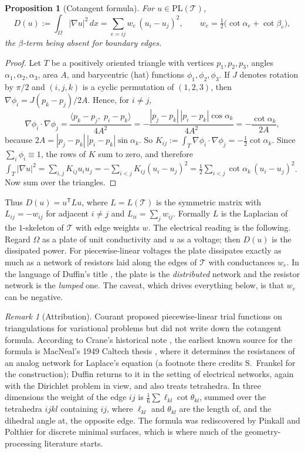 \documentclass[11pt]{amsart}
\newtheorem{proposition}[theorem]{Proposition}
\theoremstyle{definition}
\theoremstyle{remark}
\newtheorem{remark}[theorem]{Remark}
\newcommand{\cT}{\mathcal{T}}
\newcommand{\PL}{\mathrm{PL}}
\begin{document}
\begin{proposition}[Cotangent formula]\label{prop:cotan}
For $u\in\PL(\cT)$,
\[
D(u):=\int_\Omega|\nabla u|^2\,dx=\sum_{e=ij}w_e\,(u_i-u_j)^2,\qquad
w_e=\tfrac12\bigl(\cot\alpha_e+\cot\beta_e\bigr),
\]
the $\beta$-term being absent for boundary edges.
\end{proposition}

\begin{proof}
Let $T$ be a positively oriented triangle with vertices $p_1,p_2,p_3$, angles $\alpha_1,\alpha_2,\alpha_3$, area $A$,
and barycentric (hat) functions $\phi_1,\phi_2,\phi_3$. If $J$ denotes rotation by $\pi/2$ and $(i,j,k)$ is a cyclic
permutation of $(1,2,3)$, then $\nabla\phi_i=J(p_k-p_j)/2A$. Hence, for $i\neq j$,
\[
\nabla\phi_i\cdot\nabla\phi_j=\frac{\langle p_k-p_j,\;p_i-p_k\rangle}{4A^2}
=-\frac{|p_j-p_k|\,|p_i-p_k|\cos\alpha_k}{4A^2}=-\frac{\cot\alpha_k}{2A},
\]
because $2A=|p_j-p_k|\,|p_i-p_k|\sin\alpha_k$. So $K_{ij}:=\int_T\nabla\phi_i\cdot\nabla\phi_j=-\frac12\cot\alpha_k$.
Since $\sum_i\phi_i\equiv1$, the rows of $K$ sum to zero, and therefore
$\int_T|\nabla u|^2=\sum_{i,j}K_{ij}u_iu_j=-\sum_{i<j}K_{ij}(u_i-u_j)^2=\frac12\sum_{i<j}\cot\alpha_k\,(u_i-u_j)^2$.
Now sum over the triangles.
\end{proof}

Thus $D(u)=u^{\mathsf T}Lu$, where $L=L(\cT)$ is the symmetric matrix with $L_{ij}=-w_{ij}$ for adjacent $i\ne j$
and $L_{ii}=\sum_jw_{ij}$. Formally $L$ is the Laplacian of the $1$-skeleton of $\cT$ with edge weights $w$.
The electrical reading is the following. Regard $\Omega$ as a plate of unit conductivity and $u$ as a voltage;
then $D(u)$ is the dissipated power. For piecewise-linear voltages the plate dissipates exactly as much as a network of resistors
laid along the edges of $\cT$ with conductances $w_e$. In the language of Duffin's title \cite{Duf59}, the plate is the
\emph{distributed} network and the resistor network is the \emph{lumped} one. The caveat, which drives everything
below, is that $w_e$ can be negative.

\begin{remark}[Attribution]
Courant \cite{Cou43} proposed piecewise-linear trial functions on triangulations for variational problems
but did not write down the cotangent formula. According to Crane's historical note \cite{Cra19}, the earliest known
source for the formula is MacNeal's 1949 Caltech thesis \cite{Mac49}, where it determines the resistances of an analog
network for Laplace's equation (a footnote there credits S.~Frankel for the construction); Duffin \cite{Duf59} returns to it in the setting of
electrical networks, again with the Dirichlet problem in view, and also treats tetrahedra. In three dimensions the weight of the edge $ij$ is
$\frac16\sum\ell_{kl}\cot\theta_{kl}$, summed over the tetrahedra $ijkl$ containing $ij$, where $\ell_{kl}$ and $\theta_{kl}$ are the length of,
and the dihedral angle at, the opposite edge.
The formula was rediscovered by Pinkall and Polthier \cite{PP93} for discrete minimal surfaces, which is where much of the
geometry-processing literature starts.
\end{remark}
\end{document}
